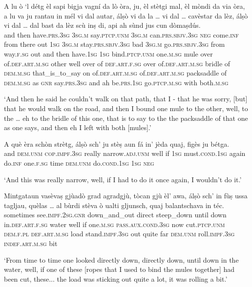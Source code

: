 \begin{linenumbers}
\gll  A lu ò `l détg èl sapi bigja vagní da lò òra, ju, èl stètgi mal, èl mòndi da via òra, a lu va ju rantau in mél vi dal autar,  álṣò vi da la … vi dal … cavèstar da lèz, álṣò vi dal … dal bast da lèz scù inṣ di, api ah sùnd jus cun dòmaṣdús.  \\
and then have.\textsc{prs.3sg} \textsc{3sg.m} say.\textsc{ptcp.unm} \textsc{3sg.m} can.\textsc{prs.sbjv.3sg} \textsc{neg} come.\textsc{inf} from there out \textsc{1sg}  \textsc{3sg.m} stay.\textsc{prs.sbjv.3sg} bad \textsc{3sg.m} go.\textsc{prs.sbjv.3sg} from way.\textsc{f.sg} out and then have.\textsc{1sg} \textsc{1sg} bind.\textsc{ptcp.unm} one.\textsc{m.sg} mule over of.\textsc{def.art.m.sg} other well over of \textsc{def.art.f.sg} {} over of.\textsc{def.art.m.sg} {} bridle of \textsc{dem.m.sg} that\_is\_to\_say on of.\textsc{def.art.m.sg} {} of.\textsc{def.art.m.sg} packsaddle of \textsc{dem.m.sg} as \textsc{gnr}  say.\textsc{prs.3sg} and ah be.\textsc{prs.1sg} go.\textsc{ptcp.m.sg} with both.\textsc{m.sg} \\
\end{linenumbers}
\medskip
\glt `And then he said he couldn’t walk on that path, that I - that he was sorry, [but] that he would walk on the road, and then I bound one mule to the other, well, to the … eh to the bridle of this one, that is to say to the the packsaddle of that one as one says, and then eh I left with both [mules].'
\medskip

\begin{linenumbers}
\gll  A què èra schòn strètg, álṣò sch’ ju stèṣ aun fá in’ jèda quaj, figès ju bétga.  \\
 and \textsc{dem.unm} \textsc{cop.impf.3sg} really narrow.\textsc{adj.unm} well if \textsc{1sg}  must.\textsc{cond.1sg} again do.\textsc{inf} one.\textsc{f.sg} time \textsc{dem.unm} do.\textsc{cond.1sg} \textsc{1sg} \textsc{neg} \\
\end{linenumbers}
\medskip
\glt `And this was really narrow, well, if I had to do it once again, I wouldn’t do it.'
\medskip

\begin{linenumbers}
\gll  Mintgataun vasèvaṣ gjùadò grad agradgjù, tòcan gjù èl’ awa, álṣò sch’ in fùṣ ussa tagljau, quèlas … al bùrdi stèva ò ualti gljunsch, quaj balantschava in téc.  \\
sometimes see.\textsc{impf.2sg.gnr} down\_and\_out direct steep\_down until down in.\textsc{def.art.f.sg} water well if one.\textsc{m.sg} \textsc{pass.aux.cond.3sg} now cut.\textsc{ptcp.unm} \textsc{dem.f.pl} {}  \textsc{def.art.m.sg} load  stand.\textsc{impf.3sg} out quite far \textsc{dem.unm} roll.\textsc{impf.3sg}  \textsc{indef.art.m.sg} bit\\
\end{linenumbers}
\medskip
\glt `From time to time one looked directly down, directly down, until down in the water, well, if one of these [ropes that I used to bind the mules together] had been cut, these... the load was sticking out quite a lot, it was rolling a bit.'
\medskip

